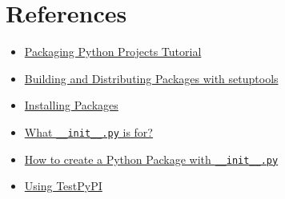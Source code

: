 \documentclass[12pt, a4paper]{article}
\begin{document}
\section*{References}
\label{sec:orgf865d35}
\begin{itemize}
\item \href{https://packaging.python.org/tutorials/packaging-projects/}{Packaging Python Projects Tutorial}
\item \href{https://setuptools.readthedocs.io/en/latest/setuptools.html}{Building and Distributing Packages with setuptools}
\item \href{https://packaging.python.org/tutorials/installing-packages/\#installing-from-local-archives}{Installing Packages}
\item \href{https://stackoverflow.com/questions/448271/what-is-init-py-for}{What \texttt{\_\_init\_\_.py} is for?}
\item \href{https://timothybramlett.com/How\_to\_create\_a\_Python\_Package\_with\_\_\_init\_\_py.html}{How to create a Python Package with \texttt{\_\_init\_\_.py}}
\item \href{https://packaging.python.org/guides/using-testpypi/}{Using TestPyPI}
\end{itemize}
\end{document}
